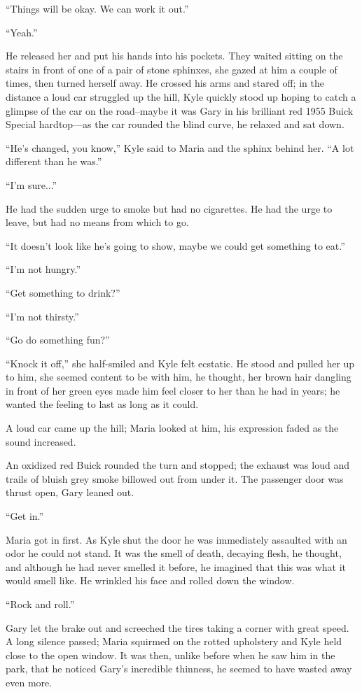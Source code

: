 \documentclass[
]{article}
\begin{document}
``Things will be okay. We can work it out.''

``Yeah.''

He released her and put his hands into his pockets. They waited sitting
on the stairs in front of one of a pair of stone sphinxes, she gazed at
him a couple of times, then turned herself away. He crossed his arms and
stared off; in the distance a loud car struggled up the hill, Kyle
quickly stood up hoping to catch a glimpse of the car on the road--maybe
it was Gary in his brilliant red 1955 Buick Special hardtop---as the car
rounded the blind curve, he relaxed and sat down.

``He's changed, you know,'' Kyle said to Maria and the sphinx behind
her. ``A lot different than he was.''

``I'm sure...''

He had the sudden urge to smoke but had no cigarettes. He had the urge
to leave, but had no means from which to go.

``It doesn't look like he's going to show, maybe we could get something
to eat.''

``I'm not hungry.''

``Get something to drink?''

``I'm not thirsty.''

``Go do something fun?''

``Knock it off,'' she half-smiled and Kyle felt ecstatic. He stood and
pulled her up to him, she seemed content to be with him, he thought, her
brown hair dangling in front of her green eyes made him feel closer to
her than he had in years; he wanted the feeling to last as long as it
could.

A loud car came up the hill; Maria looked at him, his expression faded
as the sound increased.

An oxidized red Buick rounded the turn and stopped; the exhaust was loud
and trails of bluish grey smoke billowed out from under it. The
passenger door was thrust open, Gary leaned out.

``Get in.''

Maria got in first. As Kyle shut the door he was immediately assaulted
with an odor he could not stand. It was the smell of death, decaying
flesh, he thought, and although he had never smelled it before, he
imagined that this was what it would smell like. He wrinkled his face
and rolled down the window.

``Rock and roll.''

Gary let the brake out and screeched the tires taking a corner with
great speed. A long silence passed; Maria squirmed on the rotted
upholstery and Kyle held close to the open window. It was then, unlike
before when he saw him in the park, that he noticed Gary's incredible
thinness, he seemed to have wasted away even more.
\end{document}
